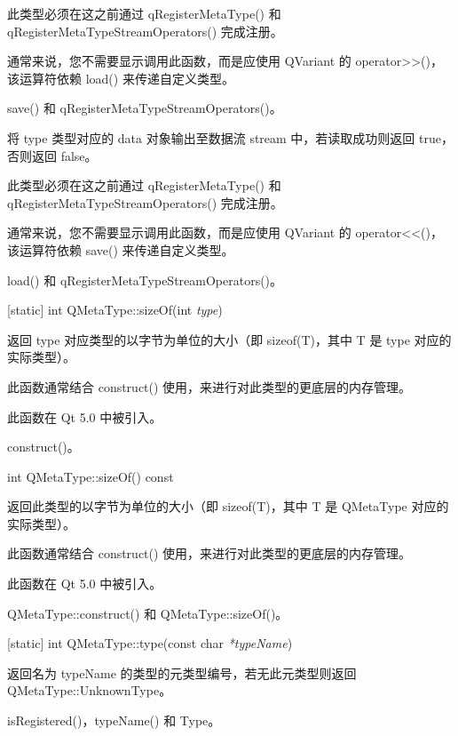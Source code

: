 此类型必须在这之前通过 qRegisterMetaType() 和 qRegisterMetaTypeStreamOperators() 完成注册。

通常来说，您不需要显示调用此函数，而是应使用 QVariant 的 operator>>()，
该运算符依赖 load() 来传递自定义类型。

\begin{seeAlso}
save() 和 qRegisterMetaTypeStreamOperators()。
\end{seeAlso}

将 type 类型对应的 data 对象输出至数据流 stream 中，若读取成功则返回 true，否则返回 false。

此类型必须在这之前通过 qRegisterMetaType() 和 qRegisterMetaTypeStreamOperators() 完成注册。

通常来说，您不需要显示调用此函数，而是应使用 QVariant 的 operator<<()，
该运算符依赖 save() 来传递自定义类型。

\begin{seeAlso}
load() 和 qRegisterMetaTypeStreamOperators()。
\end{seeAlso}

[static] int QMetaType::sizeOf(int \emph{type})

返回 type 对应类型的以字节为单位的大小（即 sizeof(T)，其中 T 是 type 对应的实际类型）。

此函数通常结合 construct() 使用，来进行对此类型的更底层的内存管理。

此函数在 Qt 5.0 中被引入。

\begin{seeAlso}
construct()。
\end{seeAlso}

int QMetaType::sizeOf() const

返回此类型的以字节为单位的大小（即 sizeof(T)，其中 T 是 QMetaType 对应的实际类型）。

此函数通常结合 construct() 使用，来进行对此类型的更底层的内存管理。

此函数在 Qt 5.0 中被引入。

\begin{seeAlso}
QMetaType::construct() 和 QMetaType::sizeOf()。
\end{seeAlso}

[static] int QMetaType::type(const char \emph{*typeName})

返回名为 typeName 的类型的元类型编号，若无此元类型则返回 QMetaType::UnknownType。

\begin{seeAlso}
isRegistered()，typeName() 和 Type。
\end{seeAlso}


